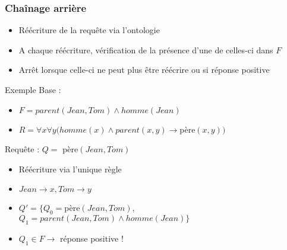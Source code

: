 \begin{frame}
	\frametitle{Chaînage arrière}
	\begin{itemize}
		\item Réécriture de la requête via l'ontologie
		\item A chaque réécriture, vérification de la présence d'une de celles-ci dans
		$F$
		\item Arrêt lorsque celle-ci ne peut plus être réécrire ou si réponse positive
	\end{itemize}
	\begin{exampleblock}{Exemple}
	Base :
	\begin{itemize}
		\item $F = parent(Jean,Tom) \wedge homme(Jean)$
		\item $R = \forall x \forall y (homme(x) \wedge parent(x,y) \rightarrow
		$père$(x,y))$
	\end{itemize}
	Requête : $Q = $ père$(Jean,Tom)$\\
	\begin{itemize}
		\item Réécriture via l'unique règle
		\item $Jean \rightarrow x, Tom \rightarrow y$
		\item $Q' = \{Q_0 = $père$(Jean,Tom)$, $Q_1 = parent(Jean,Tom) \wedge
		homme(Jean) \}$
		\item $Q_1 \in F \rightarrow$ réponse positive !
	\end{itemize}
	\end{exampleblock}
\end{frame}


